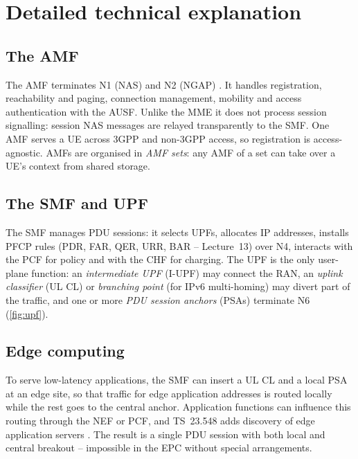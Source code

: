 \documentclass[11pt,a4paper]{article}
\begin{document}
\section{Detailed technical explanation}

\subsection{The AMF}
The AMF terminates N1 (NAS) and N2 (NGAP) \cite{ts24501,ts38413}. It handles registration, reachability and paging,
connection management, mobility and access authentication with the AUSF. Unlike the MME it does not process session
signalling: session NAS messages are relayed transparently to the SMF. One AMF serves a UE across 3GPP and non-3GPP
access, so registration is access-agnostic. AMFs are organised in \emph{AMF sets}: any AMF of a set can take over a UE's
context from shared storage.

\subsection{The SMF and UPF}
The SMF manages PDU sessions: it selects UPFs, allocates IP addresses, installs PFCP rules (PDR, FAR, QER, URR, BAR -- Lecture~13)
over N4, interacts with the PCF for policy and with the CHF for charging. The UPF is the only user-plane function: an
\emph{intermediate UPF} (I-UPF) may connect the RAN, an \emph{uplink classifier} (UL CL) or \emph{branching point} (for IPv6
multi-homing) may divert part of the traffic, and one or more \emph{PDU session anchors} (PSAs) terminate N6 (\cref{fig:upf}).

\begin{acnfigure}
  \caption{A PDU session with an uplink classifier and two anchors: local edge breakout and central Internet access.}
  \label{fig:upf}
\end{acnfigure}

\subsection{Edge computing}
To serve low-latency applications, the SMF can insert a UL CL and a local PSA at an edge site, so that traffic for edge
application addresses is routed locally while the rest goes to the central anchor. Application functions can influence this
routing through the NEF or PCF, and TS~23.548 adds discovery of edge application servers \cite{ts23548}. The result is a single
PDU session with both local and central breakout -- impossible in the EPC without special arrangements.
\end{document}
